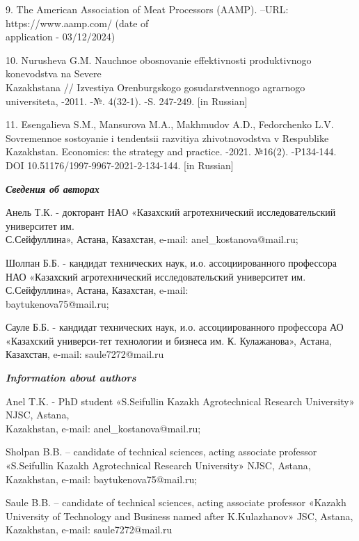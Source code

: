 \begin{noparindent}
9. The American Association of Meat Processors (AAMP). --URL:
https://www.aamp.com/ (date of \\application - 03/12/2024)

10. Nurusheva G.M. Nauchnoe obosnovanie effektivnosti produktivnogo
konevodstva na Severe \\Kazakhstana // Izvestiya Orenburgskogo
gosudarstvennogo agrarnogo universiteta, -2011. -№. 4(32-1). -S.
247-249. {[}in Russian{]}

11. Esengalieva S.M., Mansurova M.A., Makhmudov A.D., Fedorchenko L.V.
Sovremennoe sostoyanie i tendentsii razvitiya zhivotnovodstva v
Respublike Kazakhstan. Economics: the strategy and practice. -2021.
№16(2). -P134-144. DOI 10.51176/1997-9967-2021-2-134-144. {[}in
Russian{]}

\end{noparindent}

\emph{{\bfseries Сведения об авторах}}

\begin{noparindent}

Анель Т.К. - докторант НАО «Казахский агротехнический исследовательский
университет им. \\С.Сейфуллина», Астана, Казахстан, e-mail:
anel\_kostanova@mail.ru;

Шолпан Б.Б. - кандидат технических наук, и.о. ассоциированного
профессора НАО «Казахский агротехнический исследовательский университет
им. С.Сейфуллина», Астана, Казахстан, e-mail: \\baytukenova75@mail.ru;

Сауле Б.Б. - кандидат технических наук, и.о. ассоциированного профессора
АО «Казахский универси-тет технологии и бизнеса им. К. Кулажанова»,
Астана, Казахстан, e-mail: saule7272@mail.ru

\end{noparindent}

\emph{{\bfseries Information about authors}}

\begin{noparindent}

Anel T.K. - PhD student «S.Seifullin Kazakh Agrotechnical Research
University» NJSC, Astana, \\Kazakhstan, e-mail: anel\_kostanova@mail.ru;

Sholpan B.B. -- candidate of technical sciences, acting associate
professor «S.Seifullin Kazakh Agrotechnical Research University» NJSC,
Astana, Kazakhstan, e-mail: baytukenova75@mail.ru;

Saule B.B. -- candidate of technical sciences, acting associate
professor «Kazakh University of Technology and Business named after
K.Kulazhanov» JSC, Astana, Kazakhstan, e-mail: saule7272@mail.ru
\end{noparindent}
